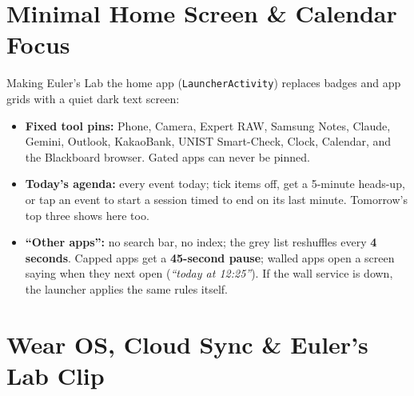 \documentclass[11pt,a4paper]{article}
\begin{document}
\section{Minimal Home Screen \& Calendar Focus}
Making Euler's Lab the home app (\texttt{LauncherActivity}) replaces badges and app grids with a quiet dark text screen:
\begin{itemize}
  \item \textbf{Fixed tool pins:} Phone, Camera, Expert RAW, Samsung Notes, Claude, Gemini, Outlook, KakaoBank, UNIST Smart-Check, Clock, Calendar, and the Blackboard browser. Gated apps can never be pinned.
  \item \textbf{Today's agenda:} every event today; tick items off, get a 5-minute heads-up, or tap an event to start a session timed to end on its last minute. Tomorrow's top three shows here too.
  \item \textbf{``Other apps'':} no search bar, no index; the grey list reshuffles every \textbf{4 seconds}. Capped apps get a \textbf{45-second pause}; walled apps open a screen saying when they next open (\emph{``today at 12:25''}). If the wall service is down, the launcher applies the same rules itself.
\end{itemize}

\section{Wear OS, Cloud Sync \& Euler's Lab Clip}
\end{document}
